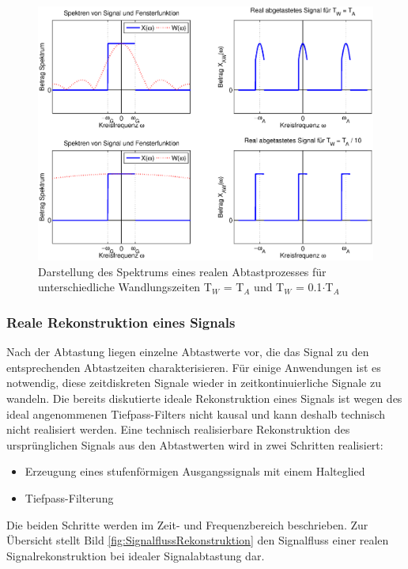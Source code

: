 \begin{figure}[H]
  \centerline{\includegraphics[width=1\textwidth]{Kapitel1/Bilder/image14}}
  \caption{ Darstellung des Spektrums eines realen Abtastprozesses für unterschiedliche Wandlungszeiten T$_{W}$ = T$_{A}$ und T$_{W}$ = 0.1$\cdot$T$_{A}$
}
  \label{fig:AbtastprozessRealSpektrum}
\end{figure}


\subsubsection{Reale Rekonstruktion eines Signals}

\noindent Nach der Abtastung liegen einzelne Abtastwerte vor, die das Signal zu den entsprechenden Abtastzeiten charakterisieren. F\"{u}r einige Anwendungen ist es notwendig, diese zeitdiskreten Signale wieder in zeitkontinuierliche Signale zu wandeln. Die bereits diskutierte ideale Rekonstruktion eines Signals ist wegen des ideal angenommenen Tiefpass-Filters nicht kausal und kann deshalb technisch nicht realisiert werden. Eine technisch realisierbare Rekonstruktion des urspr\"{u}nglichen Signals aus den Abtastwerten wird in zwei Schritten realisiert: 

\begin{itemize}
\item  Erzeugung eines stufenf\"{o}rmigen Ausgangssignals mit einem Halteglied
\item  Tiefpass-Filterung
\end{itemize}

\noindent Die beiden Schritte werden im Zeit- und Frequenzbereich beschrieben. Zur \"{U}bersicht stellt Bild \ref{fig:SignalflussRekonstruktion} den Signalfluss einer realen Signalrekonstruktion bei idealer Signalabtastung dar.

